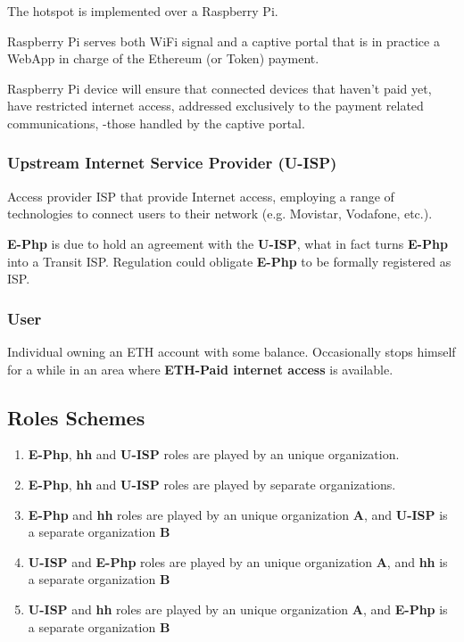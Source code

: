 \documentclass[12pt]{report}
\begin{document}
  The hotspot is implemented over a Raspberry Pi.

  Raspberry Pi serves both WiFi signal and a captive portal that is in practice a WebApp in charge of the Ethereum (or Token) payment.

  Raspberry Pi device will ensure that connected devices that haven’t paid yet, have restricted internet access, addressed exclusively to the payment related communications, -those handled by the captive portal.

  \subsubsection{Upstream Internet Service Provider (U-ISP)}

  Access provider ISP that provide Internet access, employing a range of technologies to connect users to their network (e.g. Movistar, Vodafone,  etc.).

  \textbf{E-Php} is due to hold an agreement with the \textbf{U-ISP}, what in fact turns
  \textbf{E-Php} into a Transit ISP. Regulation could obligate \textbf{E-Php} to be formally registered as ISP.

  \subsubsection{User}

  Individual owning an ETH account with some balance. Occasionally stops himself for a while in an area where \textbf{ETH-Paid internet access} is available.

  \subsection{Roles Schemes} \label{ch:roles-schemes}

  \begin{enumerate}
    \item \textbf{E-Php}, \textbf{hh} and \textbf{U-ISP} roles are played by an unique organization.
    \item \textbf{E-Php}, \textbf{hh} and \textbf{U-ISP} roles are played by separate organizations.
    \item \textbf{E-Php} and \textbf{hh} roles are played by an unique organization \textbf{A}, and \textbf{U-ISP} is a separate organization \textbf{B}
    \item \textbf{U-ISP} and \textbf{E-Php} roles are played by an unique organization \textbf{A}, and \textbf{hh} is a separate organization \textbf{B}
    \item \textbf{U-ISP} and \textbf{hh} roles are played by an unique organization \textbf{A}, and \textbf{E-Php} is a separate organization \textbf{B}
  \end{enumerate}
\end{document}
